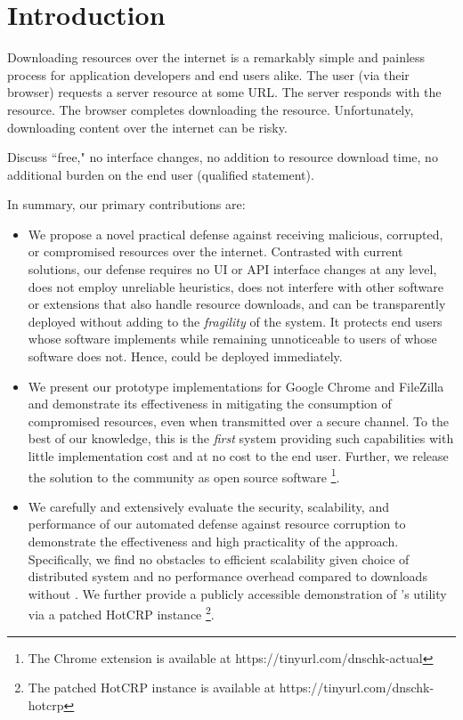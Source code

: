 \section{Introduction} \label{sec:introduction}

Downloading resources over the internet is a remarkably simple and painless
process for application developers and end users alike. The user (via their
browser) requests a server resource at some URL. The server responds with the
resource. The browser completes downloading the resource. Unfortunately,
downloading content over the internet can be risky.


Discuss ``free," \ie no interface changes, no addition to resource download time, no
additional burden on the end user (qualified statement).

\cite{DNSSEC}

In summary, our primary contributions are:

\begin{itemize}

  \item We propose a novel practical defense against receiving malicious,
  corrupted, or compromised resources over the internet. Contrasted with current
  solutions, our defense requires no UI or API interface changes at any level,
  does not employ unreliable heuristics, does not interfere with other software
  or extensions that also handle resource downloads, and can be transparently
  deployed without adding to the \textit{fragility} of the system. It protects
  end users whose software implements \SYSTEM{} while remaining unnoticeable to
  users of whose software does not. Hence, \SYSTEM{} could be deployed
  immediately.

  \item We present our prototype \SYSTEM{} implementations for Google Chrome and
  FileZilla and demonstrate its effectiveness in mitigating the consumption of
  compromised resources, even when transmitted over a secure channel. To the
  best of our knowledge, this is the \emph{first} system providing such
  capabilities with little implementation cost and at no cost to the end user.
  Further, we release the \SYSTEM{} solution to the community as open source
  software \footnote{The Chrome extension is available at
  https://tinyurl.com/dnschk-actual}.

  \item We carefully and extensively evaluate the security, scalability, and
  performance of our automated defense against resource corruption to
  demonstrate the effectiveness and high practicality of the \SYSTEM{} approach.
  Specifically, we find no obstacles to efficient scalability given choice of
  distributed system and no performance overhead compared to downloads without
  \SYSTEM{}. We further provide a publicly accessible demonstration of
  \SYSTEM{}'s utility via a patched HotCRP instance \footnote{The patched HotCRP
  instance is available at https://tinyurl.com/dnschk-hotcrp}.

\end{itemize}
